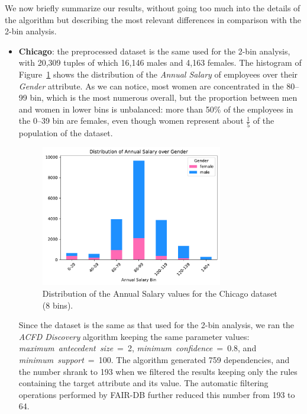 We now briefly summarize our results, without going too much into the details of the algorithm but describing the most relevant differences in comparison with the 2-bin analysis.

\begin{itemize}
\item \textbf{Chicago}: the preprocessed dataset is the same used for the 2-bin analysis, with 20,309 tuples of which 16,146 males and 4,163 females. The histogram of Figure~\ref{fig:chicago_8bins_fair-db1} shows the distribution of the \textit{Annual Salary} of employees over their \textit{Gender} attribute. As we can notice, most women are concentrated in the 80--99 bin, which is the most numerous overall, but the proportion between men and women in lower bins is unbalanced: more than 50\% of the employees in the 0--39 bin are females, even though women represent about \(\frac{1}{5}\) of the population of the dataset.

\begin{figure}[t!]
\centering
\includegraphics[width=0.75\textwidth]{figures/chicago_annual_salary_over_gender.pdf}
\caption{Distribution of the \textrm{Annual Salary} values for the Chicago dataset (8 bins).}
\label{fig:chicago_8bins_fair-db1}
\end{figure}

Since the dataset is the same as that used for the 2-bin analysis, we ran the \textit{ACFD Discovery} algorithm keeping the same parameter values: \textit{maximum~antecedent~size}~=~2, \textit{minimum~confidence}~=~0.8, and \textit{minimum~support}~=~100. The algorithm generated 759 dependencies, and the number shrank to 193 when we filtered the results keeping only the rules containing the target attribute and its value. The automatic filtering operations performed by FAIR-DB further reduced this number from 193 to 64.


\end{itemize}
